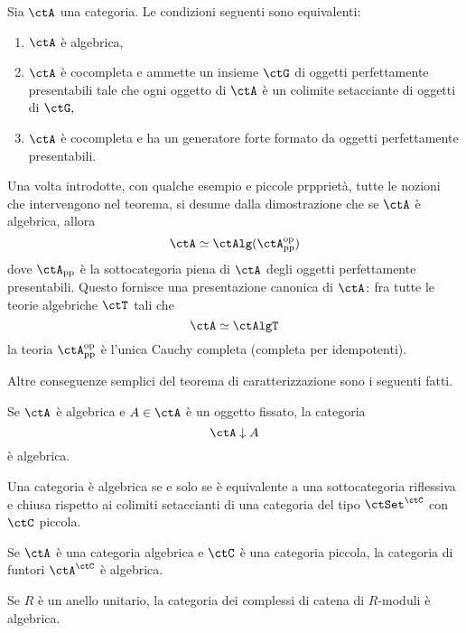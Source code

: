 \begin{theorem}\label{teo_caract_AlgT}
Sia $\ctA$ una categoria. Le condizioni seguenti sono equivalenti:
\begin{enumerate}
\item $\ctA$ è algebrica,
\item $\ctA$ è cocompleta e ammette un insieme $\ctG$ di oggetti perfettamente presentabili tale che ogni 
oggetto di $\ctA$ è un colimite setacciante di oggetti di $\ctG,$
\item $\ctA$ è cocompleta e ha un generatore forte formato da oggetti perfettamente presentabili.
\end{enumerate}
\end{theorem}

\begin{remark}\label{oss_pres_can}
Una volta introdotte, con qualche esempio e piccole prpprietà, tutte le nozioni che intervengono nel teorema, si desume 
dalla dimostrazione che se $\ctA$ è algebrica, allora 
$$\ctA \simeq \ctAlg(\ctA_{\mathrm{pp}}^{\mathrm{op}})$$
dove $\ctA_{\mathrm{pp}}$ è la sottocategoria piena di $\ctA$ degli oggetti perfettamente presentabili. Questo fornisce
una presentazione canonica di $\ctA \colon$fra tutte le teorie algebriche $\ctT$ tali che
$$\ctA \simeq \ctAlgT$$
la teoria $\ctA_{\mathrm{pp}}^{\mathrm{op}}$ è l'unica Cauchy completa (completa per idempotenti).
\end{remark}

Altre conseguenze semplici del teorema di caratterizzazione sono i seguenti fatti.

\begin{proposition}\label{prop_comma_alg}
Se $\ctA$ è algebrica e $A \in \ctA$ è un oggetto fissato, la categoria 
$$\ctA \downarrow A$$
è algebrica.
\end{proposition} 

\begin{proposition}\label{prop_repr_aAlgT}
Una categoria è algebrica se e solo se è equivalente a una sottocategoria riflessiva e chiusa rispetto ai colimiti setaccianti
di una categoria del tipo $\ctSet^{\ctC}$ con $\ctC$ piccola.
\end{proposition} 

\begin{proposition}\label{prop_stab_alg_exp}
Se $\ctA$ è una categoria algebrica e $\ctC$ è una categoria piccola, la categoria di funtori $\ctA^{\ctC}$ è algebrica.
\end{proposition}

\begin{example}\label{esempio_chain}
Se $R$ è un anello unitario, la categoria dei complessi di catena di $R$-moduli è algebrica.
\end{example} 

